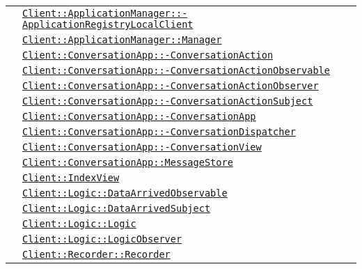 \begin{longtable}{|>{\centering}m{3cm}|m{10cm}<{\centering}|}
& \hyperref[Client::ApplicationManager::ApplicationRegistryLocalClient]{\texttt{Client::ApplicationManager::-\linebreak ApplicationRegistryLocalClient}}\\
& \hyperref[Client::ApplicationManager::Manager]{\texttt{Client::ApplicationManager::Manager}}\\
& \hyperref[Client::ConversationApp::ConversationAction]{\texttt{Client::ConversationApp::-\linebreak ConversationAction}}\\
& \hyperref[Client::ConversationApp::ConversationActionObservable]{\texttt{Client::ConversationApp::-\linebreak ConversationActionObservable}}\\
& \hyperref[Client::ConversationApp::ConversationActionObserver]{\texttt{Client::ConversationApp::-\linebreak ConversationActionObserver}}\\
& \hyperref[Client::ConversationApp::ConversationActionSubject]{\texttt{Client::ConversationApp::-\linebreak ConversationActionSubject}}\\
& \hyperref[Client::ConversationApp::ConversationApp]{\texttt{Client::ConversationApp::-\linebreak ConversationApp}}\\
& \hyperref[Client::ConversationApp::ConversationDispatcher]{\texttt{Client::ConversationApp::-\linebreak ConversationDispatcher}}\\
& \hyperref[Client::ConversationApp::ConversationView]{\texttt{Client::ConversationApp::-\linebreak ConversationView}}\\
& \hyperref[Client::ConversationApp::MessageStore]{\texttt{Client::ConversationApp::MessageStore}}\\
& \hyperref[Client::IndexView]{\texttt{Client::IndexView}}\\
& \hyperref[Client::Logic::DataArrivedObservable]{\texttt{Client::Logic::DataArrivedObservable}}\\
& \hyperref[Client::Logic::DataArrivedSubject]{\texttt{Client::Logic::DataArrivedSubject}}\\
& \hyperref[Client::Logic::Logic]{\texttt{Client::Logic::Logic}}\\
& \hyperref[Client::Logic::LogicObserver]{\texttt{Client::Logic::LogicObserver}}\\
& \hyperref[Client::Recorder::Recorder]{\texttt{Client::Recorder::Recorder}}\\

\end{longtable}
